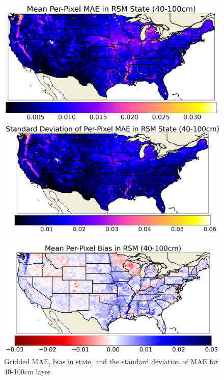 \begin{figure}[hp!]
    \centering

    \includegraphics[width=.48\linewidth,draft=false]{figures/grid-eval_lstm-rsm-9_full/eval-grid_full_lstm-rsm-9_rsm-100_spatial-stats_abs-err_state-err-abs-mean.png}
    \includegraphics[width=.48\linewidth,draft=false]{figures/grid-eval_lstm-rsm-9_full/eval-grid_full_lstm-rsm-9_rsm-100_spatial-stats_abs-err_state-err-abs-stdev.png}

    \includegraphics[width=.48\linewidth,draft=false]{figures/grid-eval_lstm-rsm-9_full/eval-grid_full_lstm-rsm-9_rsm-100_spatial-stats_bias_state-err-bias-mean.png}

    \caption{Gridded MAE, bias in state, and the standard deviation of MAE for 40-100cm layer}
    \label{acclstm-rsm-9-grid-rsm-100}
\end{figure}

